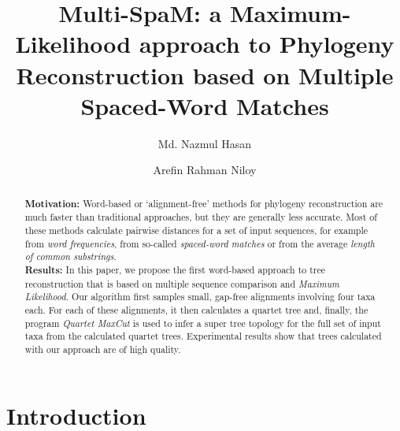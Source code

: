 \documentclass[review]{elsarticle}
\begin{document}
\begin{frontmatter}

\title{Multi-SpaM: a Maximum-Likelihood approach to Phylogeny Reconstruction based on Multiple Spaced-Word Matches}

\author{Md. Nazmul Hasan }

\author{Arefin Rahman Niloy}


\begin{abstract}
\textbf{Motivation:} 
Word-based or `alignment-free' methods for phylogeny
reconstruction are much faster
than traditional approaches, but they are generally less
accurate. Most of these methods calculate pairwise distances for a set
of input sequences, for example from {\em word frequencies}, from so-called {\em spaced-word matches} or from the average {\em length of common substrings}.
\\ 
\textbf{Results:}
In this paper, we propose the first word-based approach to tree reconstruction that is based on multiple sequence comparison and {\em Maximum Likelihood}.
Our algorithm first samples small, gap-free
alignments involving four taxa each. For each of these alignments,
it then calculates a quartet tree and, finally, the program {\em Quartet MaxCut} is used to infer a super tree topology for the full set of input
taxa from the calculated quartet trees. Experimental results show that trees
calculated with our approach are of high quality.
%

\end{abstract}
\end{frontmatter}

\section{Introduction}
\end{document}
